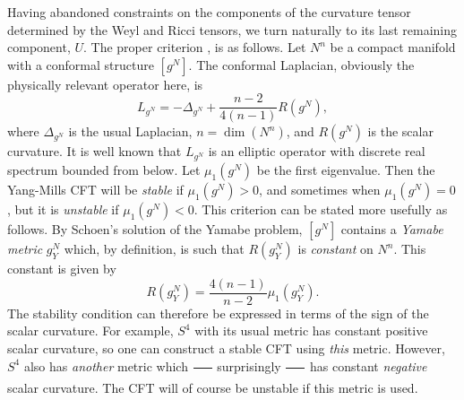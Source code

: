 \documentclass[a4paper,12pt]{article}
\theoremstyle{definition}
\renewcommand{\u}{\textit}
\renewcommand{\-}{$\dfrac{\quad\enspace}{\quad}$}
\begin{document}
Having abandoned constraints on the components of the curvature tensor determined by the Weyl and Ricci tensors, we turn naturally to its last remaining component, $U$. The proper criterion \cite{3},\cite{6} is as follows. Let $N^n$ be a compact manifold with a conformal structure $[g^N]$. The conformal Laplacian, obviously the physically relevant operator here, is \cite{10}
\begin{equation}
L_{g^N}=-\Delta_{g^N} +\dfrac{n-2}{4(n-1)}R(g^N),
\end{equation}
where $\Delta_{g^N}$ is the usual Laplacian, $n=\dim(N^n)$, and $R(g^N)$ is the scalar curvature. It is well known that $L_{g^N}$ is an elliptic operator with discrete real spectrum bounded from below. Let $\mu_1(g^N)$ be the first eigenvalue. Then the Yang-Mills CFT will be \u{stable} if $\mu_1(g^N)>0$, and sometimes when $\mu_1(g^N)=0$, but it is \u{unstable} if $\mu_1(g^N)<0$. This criterion can be stated more usefully as follows. By Schoen's solution \cite{11} of the Yamabe problem, $[g^N]$ contains a \u{Yamabe metric} $g^N_Y$ which, by definition, is such that $R(g^N_Y)$ is \u{constant} on $N^n$. This constant is given by
\begin{equation}
R(g^N_Y)=\frac{4(n-1)}{n-2}\mu_1(g^N_Y).
\end{equation}
The stability condition can therefore be expressed in terms of the sign of the scalar curvature. For example, $S^4$ with its usual metric has constant positive scalar curvature, so one can construct a stable CFT using \u{this} metric. However, $S^4$ also has \u{another} metric which \- surprisingly \- has constant \u{negative} scalar curvature. The CFT will of course be unstable if this metric is used. 
\end{document}
